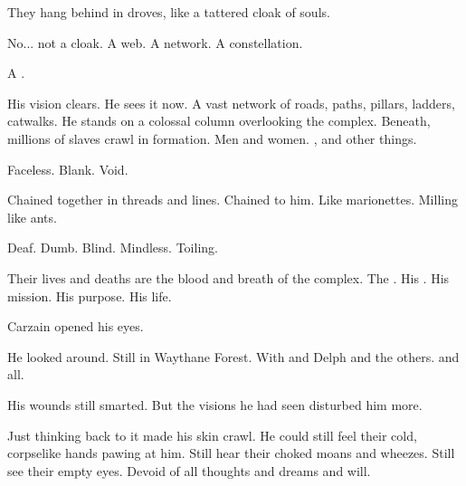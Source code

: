 \begin{garbage}
\begin{dream}
They hang behind in droves, like a tattered cloak of souls. 

No... not a cloak. 
A web. 
A network. 
A constellation. 

A \matrix. 

His vision clears. 
He sees it now. 
A vast network of roads, paths, pillars, ladders, catwalks. 
He stands on a colossal column overlooking the complex. 
Beneath, millions of slaves crawl in formation. 
Men and women.
\Humans{}, \scathae{} and other things. 

Faceless. 
Blank. 
Void. 

Chained together in threads and lines. 
Chained to him. 
Like marionettes. 
Milling like ants. 

Deaf. 
Dumb. 
Blind. 
Mindless. 
Toiling. 

Their lives and deaths are the blood and breath of the complex. 
The \matrix. 
His \matrix. 
His mission. 
His purpose. 
His life. 
\end{dream}

\begin{comment}
\subsubsection{Awake}
\end{comment}
\new
Carzain opened his eyes. 

He looked around. 
Still in Waythane Forest. 
With \Tsekkect{} and Delph and the others. 
\Relcs{} and all. 

His wounds still smarted. 
But the visions he had seen disturbed him more. 


Just thinking back to it made his skin crawl. 
He could still feel their cold, corpselike hands pawing at him. 
Still hear their choked moans and wheezes. 
Still see their empty eyes. 
Devoid of all thoughts and dreams and will. 


\end{garbage}
